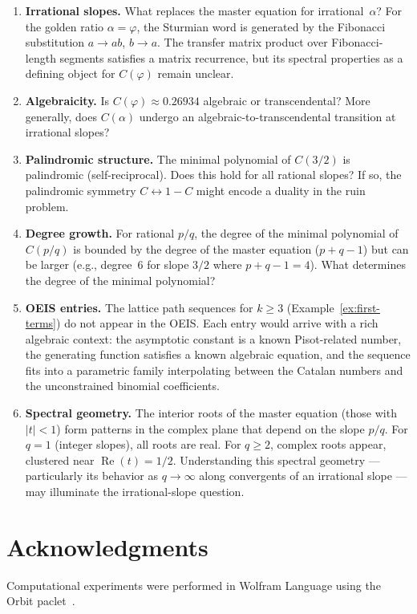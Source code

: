 \documentclass[11pt]{article}
\theoremstyle{definition}
\theoremstyle{remark}
\begin{document}
\begin{enumerate}
\item \textbf{Irrational slopes.}
  What replaces the master equation for irrational~$\alpha$?
  For the golden ratio $\alpha = \varphi$, the Sturmian word is
  generated by the Fibonacci substitution $a \to ab$, $b \to a$.
  The transfer matrix product over Fibonacci-length segments satisfies
  a matrix recurrence, but its spectral properties as a defining
  object for $C(\varphi)$ remain unclear.

\item \textbf{Algebraicity.}
  Is $C(\varphi) \approx 0.26934$ algebraic or transcendental?
  More generally, does $C(\alpha)$ undergo an algebraic-to-transcendental
  transition at irrational slopes?

\item \textbf{Palindromic structure.}
  The minimal polynomial of $C(3/2)$ is palindromic (self-reciprocal).
  Does this hold for all rational slopes?
  If so, the palindromic symmetry $C \leftrightarrow 1 - C$ might
  encode a duality in the ruin problem.

\item \textbf{Degree growth.}
  For rational $p/q$, the degree of the minimal polynomial of $C(p/q)$
  is bounded by the degree of the master equation ($p + q - 1$) but can
  be larger (e.g., degree~6 for slope $3/2$ where $p + q - 1 = 4$).
  What determines the degree of the minimal polynomial?

\item \textbf{OEIS entries.}
  The lattice path sequences for $k \geq 3$ (Example~\ref{ex:first-terms})
  do not appear in the OEIS.
  Each entry would arrive with a rich algebraic context: the asymptotic
  constant is a known Pisot-related number, the generating function
  satisfies a known algebraic equation, and the sequence fits into
  a parametric family interpolating between the Catalan numbers
  and the unconstrained binomial coefficients.

\item \textbf{Spectral geometry.}
  The interior roots of the master equation (those with $|t| < 1$) form
  patterns in the complex plane that depend on the slope $p/q$.
  For $q = 1$ (integer slopes), all roots are real.
  For $q \geq 2$, complex roots appear, clustered near $\operatorname{Re}(t)
  = 1/2$.
  Understanding this spectral geometry --- particularly its behavior as
  $q \to \infty$ along convergents of an irrational slope --- may
  illuminate the irrational-slope question.
\end{enumerate}

\section*{Acknowledgments}

Computational experiments were performed in Wolfram Language using the
Orbit paclet~\cite{orbit-paclet}.



\end{document}

